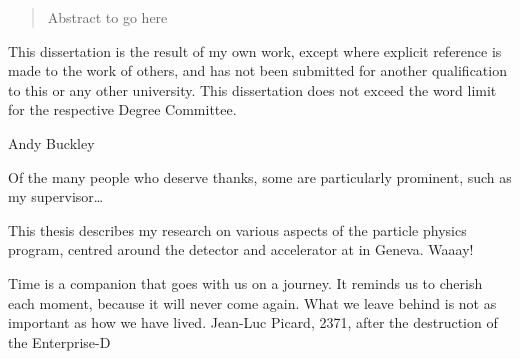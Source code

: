 


\begin{abstract}%
  Abstract to go here
\end{abstract}


\begin{declaration}
  This dissertation is the result of my own work, except where explicit
  reference is made to the work of others, and has not been submitted
  for another qualification to this or any other university. This
  dissertation does not exceed the word limit for the respective Degree
  Committee.
  \vspace*{1cm}
  \begin{flushright}
    Andy Buckley
  \end{flushright}
\end{declaration}


\begin{acknowledgements}
  Of the many people who deserve thanks, some are particularly prominent,
  such as my supervisor\dots
\end{acknowledgements}


\begin{preface}
  This thesis describes my research on various aspects of the \LHCb
  particle physics program, centred around the \LHCb detector and \LHC
  accelerator at \CERN in Geneva. Waaay!

  \noindent
\end{preface}

\tableofcontents

\frontquote%
  {Time is a companion that goes with us on a journey. It reminds us to cherish each moment, because it will never come again. What we leave behind is not as important as how we have lived.}%
  {Jean-Luc Picard, 2371, after the destruction of the Enterprise-D}
